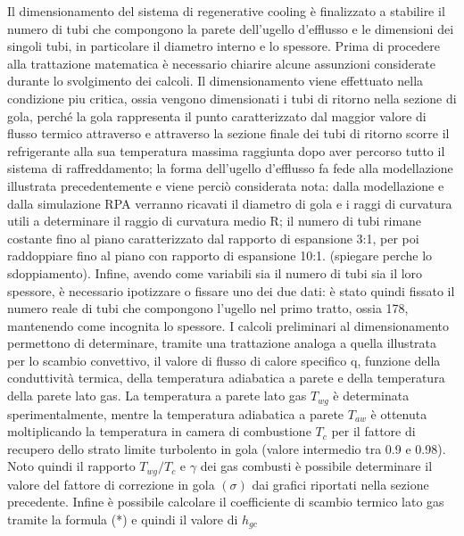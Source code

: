 Il dimensionamento del sistema di regenerative cooling è finalizzato a stabilire il numero di tubi che compongono la parete dell'ugello d'efflusso e le dimensioni dei singoli tubi, in particolare il diametro interno e lo spessore. Prima di procedere alla trattazione matematica è necessario chiarire alcune assunzioni considerate durante lo svolgimento dei calcoli. Il dimensionamento viene effettuato nella condizione piu critica, ossia vengono dimensionati i tubi di ritorno nella sezione di gola, perché la gola rappresenta il punto caratterizzato dal maggior valore di flusso termico attraverso e attraverso la sezione finale dei tubi di ritorno scorre il refrigerante alla sua temperatura massima raggiunta dopo aver percorso tutto il sistema di raffreddamento; la forma dell'ugello d'efflusso fa fede alla modellazione illustrata precedentemente e viene perciò considerata nota: dalla modellazione e dalla simulazione RPA verranno ricavati il diametro di gola e i raggi di curvatura utili a determinare il raggio di curvatura medio R; il numero di tubi rimane costante fino al piano caratterizzato dal rapporto di espansione 3:1, per poi raddoppiare fino al piano con rapporto di espansione 10:1. (spiegare perche lo sdoppiamento). Infine, avendo come variabili sia il numero di tubi sia il loro spessore, è necessario ipotizzare o fissare uno dei due dati: è stato quindi fissato il numero reale di tubi che compongono l'ugello nel primo tratto, ossia 178, mantenendo come incognita lo spessore.
I calcoli preliminari al dimensionamento permettono di determinare, tramite una trattazione analoga a quella illustrata per lo scambio convettivo, il valore di flusso di calore specifico q, funzione della conduttività termica, della temperatura adiabatica a parete e della temperatura della parete lato gas. 
La temperatura a parete lato gas $T_{wg}$ è determinata sperimentalmente, mentre la temperatura adiabatica a parete $T_{aw}$ è ottenuta moltiplicando la temperatura in camera di combustione $T_c$ per il fattore di recupero dello strato limite turbolento in gola (valore intermedio tra 0.9 e 0.98). Noto quindi il rapporto $T_{wg}/T_c$ e $\gamma$ dei gas combusti è possibile determinare il valore del fattore di correzione in gola $\left( \sigma \right)$ dai grafici riportati nella sezione precedente. Infine è possibile calcolare il coefficiente di scambio termico lato gas tramite la formula (*)
e quindi il valore di $h_{gc}$


